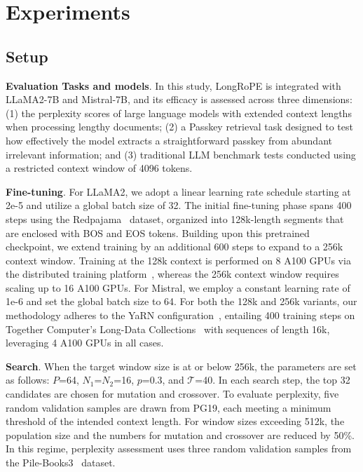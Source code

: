  \section{Experiments}

\subsection{Setup}
\textbf{Evaluation Tasks and models}. In this study, LongRoPE is integrated with LLaMA2-7B and Mistral-7B, and its efficacy is assessed across three dimensions: (1) the perplexity scores of large language models with extended context lengths when processing lengthy documents; (2) a Passkey retrieval task designed to test how effectively the model extracts a straightforward passkey from abundant irrelevant information; and (3) traditional LLM benchmark tests conducted using a restricted context window of 4096 tokens.

\textbf{Fine-tuning}. For LLaMA2, we adopt a linear learning rate schedule starting at 2e-5 and utilize a global batch size of 32. The initial fine-tuning phase spans 400 steps using the Redpajama~\cite{redpajama} dataset, organized into 128k-length segments that are enclosed with BOS and EOS tokens. Building upon this pretrained checkpoint, we extend training by an additional 600 steps to expand to a 256k context window. Training at the 128k context is performed on 8 A100 GPUs via the distributed training platform~\cite{cube}, whereas the 256k context window requires scaling up to 16 A100 GPUs. For Mistral, we employ a constant learning rate of 1e-6 and set the global batch size to 64. For both the 128k and 256k variants, our methodology adheres to the YaRN configuration~\cite{yarn}, entailing 400 training steps on Together Computer's Long-Data Collections~\cite{mistraldata} with sequences of length 16k, leveraging 4 A100 GPUs in all cases.

\textbf{Search}. When the target window size is at or below 256k, the parameters are set as follows: $P$=64, $N_1$=$N_2$=16, $p$=0.3, and $\mathcal{T}$=40. In each search step, the top 32 candidates are chosen for mutation and crossover. To evaluate perplexity, five random validation samples are drawn from PG19, each meeting a minimum threshold of the intended context length. For window sizes exceeding 512k, the population size and the numbers for mutation and crossover are reduced by 50\%. In this regime, perplexity assessment uses three random validation samples from the Pile-Books3~\cite{pile} dataset.

